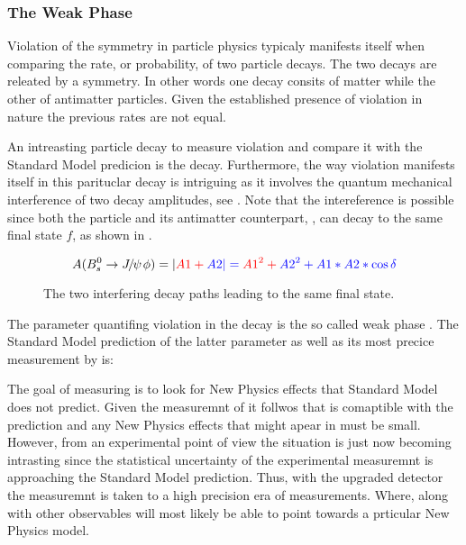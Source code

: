 \subsubsection{The Weak Phase \phis}
Violation of the \CP symmetry in particle physics typicaly manifests itself when comparing
the rate, or probability, of two particle decays. The two decays are releated by a \CP symmetry.
In other words one decay consits of matter while the other of antimatter particles.
Given the established presence of \CP violation in nature the previous rates are not equal.

An intreasting particle decay to measure \CP violation and compare it with the Standard Model
predicion is the \BsJpsiPhi decay.
Furthermore, the way \CP violation manifests itself in this parituclar decay is intriguing
as it involves the quantum mechanical interference of two decay amplitudes, see .
Note that the intereference is possible since both the \Bs particle and its antimatter counterpart,
\Bsb, can decay to the same final state $f$, as shown in .

\begin{equation}
  \centering
A(\BsJpsiPhi) = |\color{red}{A1} + \color{blue}{A2}| = \color{red}{A1}^2 + \color{blue}{A2}^2 + A1*A2*\cos\delta
  \label{app_interf_amp}
\end{equation}


\begin{figure}[h]
  \centering
  \resizebox{0.4\textwidth}{!}{}
  \caption{The two interfering decay paths leading to the same final state.}
  \label{app_interference}
\end{figure}

The parameter quantifing \CP violation in the \BsJpsiPhi decay is the so called weak phase \phis.
The Standard Model prediction of the latter parameter as well as its most precice measurement by
\lhcb is:

\noindent The goal of measuring \phis is to look for New Physics effects that Standard Model
does not predict. Given the measuremnt of  it follwos that \phis is comaptible with
the prediction and any New Physics effects that might apear in \phis must be small.
However, from an experimental point of view the situation is just now becoming intrasting
since the statistical uncertainty of the experimental measuremnt is approaching the Standard
Model prediction. Thus, with the upgraded \lhcb detector the \phis measuremnt is taken to
a high precision era of measurements. Where, along with other observables will most likely
be able to point towards a prticular New Physics model.

